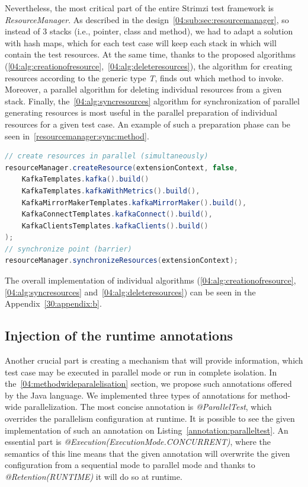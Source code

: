 Nevertheless, the most critical part of the entire Strimzi test framework is \emph{ResourceManager}.
As described in the design~\ref{04:sub:sec:resourcemanager}, so instead of 3 stacks (i.e., pointer, class and method),
we had to adapt a solution with hash maps, which for each test case will keep each stack in which will contain the test resources.
At the same time, thanks to the proposed algorithms (\ref{04:alg:creationofresource},~\ref{04:alg:deleteresources}),
the algorithm for creating resources according to the generic type \emph{T}, finds out which method to invoke.
Moreover, a parallel algorithm for deleting individual resources from a given stack.
Finally, the~\ref{04:alg:syncresources} algorithm for synchronization of parallel generating resources is most useful
in the parallel preparation of individual resources for a given test case.
An example of such a preparation phase can be seen in~\ref{resourcemanager:sync:method}.
\begin{lstlisting}[language=Java,label=resourcemanager:sync:method,caption=Example of parallel preparation of resources,frame=tb]
// create resources in parallel (simultaneously)
resourceManager.createResource(extensionContext, false,
    KafkaTemplates.kafka().build()
    KafkaTemplates.kafkaWithMetrics().build(),
    KafkaMirrorMakerTemplates.kafkaMirrorMaker().build(),
    KafkaConnectTemplates.kafkaConnect().build(),
    KafkaClientsTemplates.kafkaClients().build()
);
// synchronize point (barrier)
resourceManager.synchronizeResources(extensionContext);
\end{lstlisting}
The overall implementation of individual algorithms (\ref{04:alg:creationofresource},\ref{04:alg:syncresources} and~\ref{04:alg:deleteresources})
can be seen in the Appendix~\ref{30:appendix:b}.

\subsection{Injection of the runtime annotations}
\label{05:sub:sec:annotations}

Another crucial part is creating a mechanism that will provide information, which test case may be executed in parallel
mode or run in complete isolation.
In the~\ref{04:methodwideparalelisation} section, we propose such annotations offered by the Java language.
We implemented three types of annotations for method-wide parallelization.
The most concise annotation is \emph{@ParallelTest}, which overrides the parallelism configuration at runtime.
It is possible to see the given implementation of such an annotation on Listing~\ref{annotation:paralleltest}.
An essential part is \emph {@Execution(ExecutionMode.CONCURRENT)}, where the semantics of this line means that the given
annotation will overwrite the given configuration from a sequential mode to parallel mode and thanks to \emph {@Retention(RUNTIME)} it will do so at runtime.

